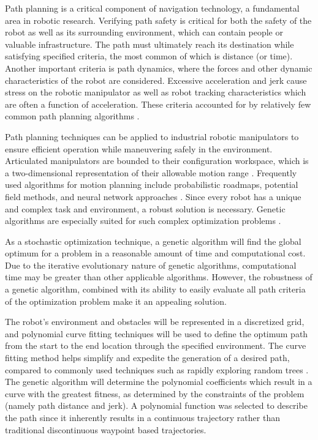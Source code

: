 
Path planning is a critical component of navigation technology, a fundamental area in robotic research. Verifying path safety is critical for both the safety of the robot as well as its surrounding environment, which can contain people or valuable infrastructure. The path must ultimately reach its destination while satisfying specified criteria, the most common of which is distance (or time). Another important criteria is path dynamics, where the forces and other dynamic characteristics of the robot are considered. Excessive acceleration and jerk cause stress on the robotic manipulator as well as robot tracking characteristics which are often a function of acceleration. These criteria accounted for by relatively few common path planning algorithms \cite{elshamli04}.

Path planning techniques can be applied to industrial robotic manipulators to ensure efficient operation while maneuvering safely in the environment. Articulated manipulators are bounded to their configuration workspace, which is a two-dimensional representation of their allowable motion range \cite{kavraki96}. Frequently used algorithms for motion planning include probabilistic roadmaps, potential field methods, and neural network approaches \cite{sharir89,khosla88,rimon92,yang00}. Since every robot has a unique and complex task and environment, a robust solution is necessary. Genetic algorithms are especially suited for such complex optimization problems \cite{renner03}.

As a stochastic optimization technique, a genetic algorithm will find the global optimum for a problem in a reasonable amount of time and computational cost. Due to the iterative evolutionary nature of genetic algorithms, computational time may be greater than other applicable algorithms. However, the robustness of a genetic algorithm, combined with its ability to easily evaluate all path criteria of the optimization problem make it an appealing solution.

The robot's environment and obstacles will be represented in a discretized grid, and polynomial curve fitting techniques will be used to define the optimum path from the start to the end location through the specified environment. The curve fitting method helps simplify and expedite the generation of a desired path, compared to commonly used techniques such as rapidly exploring random trees \cite{rodriguez06}. The genetic algorithm will determine the polynomial coefficients which result in a curve with the greatest fitness, as determined by the constraints of the problem (namely path distance and jerk). A polynomial function was selected to describe the path since it inherently results in a continuous trajectory rather than traditional discontinuous waypoint based trajectories. 

